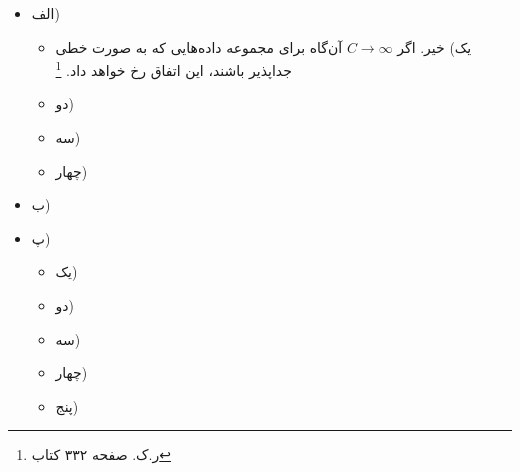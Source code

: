 
\begin{itemize}
	\item الف)
	\begin{itemize}
		\item یک)
		خیر. اگر 
		$C \rightarrow \infty$
		آن‌گاه برای مجموعه داده‌هایی که به صورت خطی جداپذیر باشند، این اتفاق رخ خواهد داد.
		\footnote{ر.ک. صفحه ۳۳۲ کتاب}
		\item دو)
		\item سه)
		\item چهار)
	\end{itemize}
	\item ب)
	\item پ)
	\begin{itemize}
		\item یک)
		\item دو)
		\item سه)
		\item چهار)
		\item پنج)
	\end{itemize}
\end{itemize}
